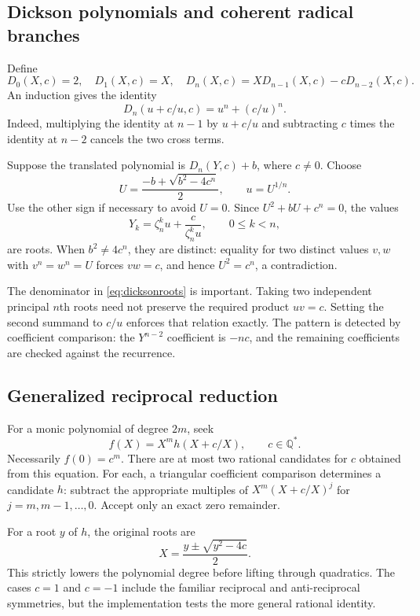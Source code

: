 \documentclass[11pt,letterpaper]{article}
\theoremstyle{definition}\newtheorem{definition}[theorem]{Definition}
\theoremstyle{remark}\newtheorem{remark}[theorem]{Remark}
\newcommand{\Q}{\mathbb Q}\newcommand{\C}{\mathbb C}\newcommand{\Z}{\mathbb Z}
\begin{document}
\subsection{Dickson polynomials and coherent radical branches}
Define
\[
 D_0(X,c)=2,\quad D_1(X,c)=X,\quad
 D_n(X,c)=X D_{n-1}(X,c)-cD_{n-2}(X,c).
\]
An induction gives the identity
\begin{equation}\label{eq:dickson}
 D_n(u+c/u,c)=u^n+(c/u)^n.
\end{equation}
Indeed, multiplying the identity at $n-1$ by $u+c/u$ and subtracting $c$ times the identity at $n-2$ cancels the two cross terms.

Suppose the translated polynomial is $D_n(Y,c)+b$, where $c\ne0$. Choose
\[
 U=\frac{-b+\sqrt{b^2-4c^n}}2,\qquad u=U^{1/n}.
\]
Use the other sign if necessary to avoid $U=0$. Since $U^2+bU+c^n=0$, the values
\begin{equation}\label{eq:dicksonroots}
 Y_k=\zeta_n^k u+\frac{c}{\zeta_n^k u},\qquad 0\leq k<n,
\end{equation}
are roots. When $b^2\ne4c^n$, they are distinct: equality for two distinct values $v,w$ with $v^n=w^n=U$ forces $vw=c$, and hence $U^2=c^n$, a contradiction.

The denominator in \eqref{eq:dicksonroots} is important. Taking two independent principal $n$th roots need not preserve the required product $uv=c$. Setting the second summand to $c/u$ enforces that relation exactly. The pattern is detected by coefficient comparison: the $Y^{n-2}$ coefficient is $-nc$, and the remaining coefficients are checked against the recurrence.

\subsection{Generalized reciprocal reduction}
For a monic polynomial of degree $2m$, seek
\begin{equation}\label{eq:reciprocal}
 f(X)=X^m h(X+c/X),\qquad c\in\Q^*.
\end{equation}
Necessarily $f(0)=c^m$. There are at most two rational candidates for $c$ obtained from this equation. For each, a triangular coefficient comparison determines a candidate $h$: subtract the appropriate multiples of $X^m(X+c/X)^j$ for $j=m,m-1,\ldots,0$. Accept only an exact zero remainder.

For a root $y$ of $h$, the original roots are
\[
 X=\frac{y\pm\sqrt{y^2-4c}}2.
\]
This strictly lowers the polynomial degree before lifting through quadratics. The cases $c=1$ and $c=-1$ include the familiar reciprocal and anti-reciprocal symmetries, but the implementation tests the more general rational identity.
\end{document}
